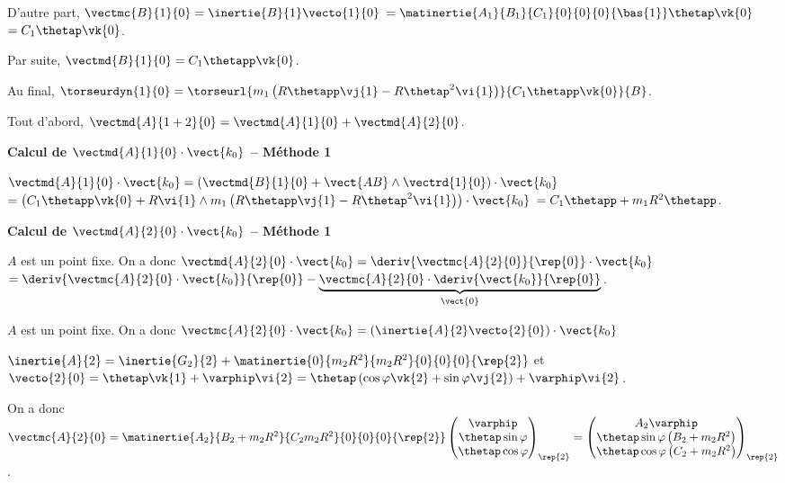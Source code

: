  D'autre part, $\vectmc{B}{1}{0} = \inertie{B}{1}\vecto{1}{0}$
 $ =\matinertie{A_1}{B_1}{C_1}{0}{0}{0}{\bas{1}} \thetap \vk{0}$
  $ =C_1 \thetap \vk{0}$.
  
  Par suite, $\vectmd{B}{1}{0} = C_1 \thetapp \vk{0}$.
  
  Au final, 
$\torseurdyn{1}{0} = \torseurl{m_1\left(R\thetapp \vj{1}-R\thetap^2 \vi{1}\right)}{C_1 \thetapp \vk{0}}{B}$.


%


\else
\fi

\ifprof

Tout d'abord, $\vectmd{A}{1+2}{0} = \vectmd{A}{1}{0}+\vectmd{A}{2}{0}$.

\textbf{Calcul de $\vectmd{A}{1}{0} \cdot \vect{k_0}$ -- Méthode 1}

$\vectmd{A}{1}{0} \cdot \vect{k_0} = \left(\vectmd{B}{1}{0} + \vect{AB} \wedge \vectrd{1}{0} \right) \cdot \vect{k_0} $
$= \left(C_1 \thetapp \vk{0} + R\vi{1} \wedge m_1\left(R\thetapp \vj{1}-R\thetap^2 \vi{1}\right) \right) \cdot \vect{k_0} $
$= C_1 \thetapp  +  m_1R^2 \thetapp  $.


\textbf{Calcul de $\vectmd{A}{2}{0} \cdot \vect{k_0}$ -- Méthode 1}

$A$ est un point fixe. On a donc 
$\vectmd{A}{2}{0} \cdot \vect{k_0} = \deriv{\vectmc{A}{2}{0}}{\rep{0}}\cdot \vect{k_0} $
$= \deriv{\vectmc{A}{2}{0}\cdot \vect{k_0}}{\rep{0}} - \underbrace{\vectmc{A}{2}{0}\cdot \deriv{ \vect{k_0}}{\rep{0}}}_{\vect{0}}$.

$A$ est un point fixe. On a donc 
$\vectmc{A}{2}{0} \cdot \vect{k_0} = \left(\inertie{A}{2} \vecto{2}{0}\right)\cdot \vect{k_0} $

$\inertie{A}{2} = \inertie{G_2}{2}+\matinertie{0}{m_2R^2}{m_2R^2}{0}{0}{0}{\rep{2}}$ et
$\vecto{2}{0} = \thetap\vk{1}+\varphip\vi{2}=\thetap\left(\cos\varphi\vk{2}+\sin\varphi\vj{2}\right)+\varphip\vi{2}$. 

On a donc $\vectmc{A}{2}{0}= \matinertie{A_2}{B_2+m_2R^2}{C_2m_2R^2}{0}{0}{0}{\rep{2}}\begin{pmatrix}
\varphip \\
\thetap\sin\varphi \\
\thetap\cos\varphi
\end{pmatrix}_{\rep{2}}
= \begin{pmatrix}
A_2 \varphip \\
\thetap\sin\varphi \left(B_2+m_2R^2\right) \\
\thetap\cos\varphi\left(C_2+m_2R^2\right)
\end{pmatrix}_{\rep{2}}
$. 

